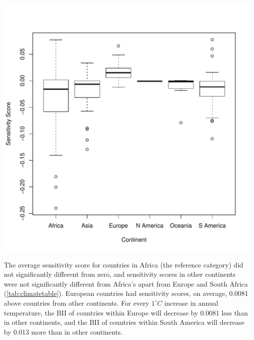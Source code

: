 \documentclass[11pt, a4paper, titlepage]{article}
\begin{document}
	\includegraphics[scale=0.95]{../images/climatesensitivityboxplot.pdf}
	\label{figure:climatebox}
	\bigskip
	
	The average sensitivity score for countries in Africa (the reference category) did not significantly different from zero, and sensitivity scores in other continents were not significantly different from Africa's apart from Europe and South Africa (\autoref{tab:climatetable}). European countries had sensitivity scores, on average, 0.0081 above countries from other continents. For every $1^\circ C$ increase in annual temperature, the BII of countries within Europe will decrease by 0.0081 less than in other continents, and the BII of countries within South America will decrease by 0.013 more than in other continents. 
	
	
\end{document}
